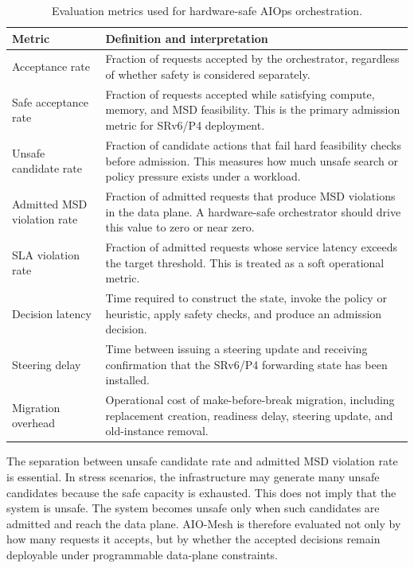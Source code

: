 \documentclass[final,5p]{elsarticle}
\begin{document}
\begin{table}[t]
\centering
\caption{Evaluation metrics used for hardware-safe AIOps orchestration.}
\label{tab:evaluation_metrics}
\renewcommand{\arraystretch}{1.15}
\small
\begin{tabular}{p{1.6cm}p{6.0cm}}
\toprule
\textbf{Metric} & \textbf{Definition and interpretation} \\
\midrule
Acceptance rate &
Fraction of requests accepted by the orchestrator, regardless of whether safety is considered separately. \\

Safe acceptance rate &
Fraction of requests accepted while satisfying compute, memory, and MSD feasibility. This is the primary admission metric for SRv6/P4 deployment. \\

Unsafe candidate rate &
Fraction of candidate actions that fail hard feasibility checks before admission. This measures how much unsafe search or policy pressure exists under a workload. \\

Admitted MSD violation rate &
Fraction of admitted requests that produce MSD violations in the data plane. A hardware-safe orchestrator should drive this value to zero or near zero. \\

SLA violation rate &
Fraction of admitted requests whose service latency exceeds the target threshold. This is treated as a soft operational metric. \\

Decision latency &
Time required to construct the state, invoke the policy or heuristic, apply safety checks, and produce an admission decision. \\

Steering delay &
Time between issuing a steering update and receiving confirmation that the SRv6/P4 forwarding state has been installed. \\

Migration overhead &
Operational cost of make-before-break migration, including replacement creation, readiness delay, steering update, and old-instance removal. \\
\bottomrule
\end{tabular}
\end{table}

The separation between unsafe candidate rate and admitted MSD violation rate is essential. In stress scenarios, the infrastructure may generate many unsafe candidates because the safe capacity is exhausted. This does not imply that the system is unsafe. The system becomes unsafe only when such candidates are admitted and reach the data plane. AIO-Mesh is therefore evaluated not only by how many requests it accepts, but by whether the accepted decisions remain deployable under programmable data-plane constraints.
\end{document}
